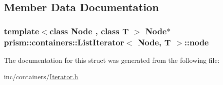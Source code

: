 \subsection{Member Data Documentation}
\subsubsection[{\texorpdfstring{node}{node}}]{\setlength{\rightskip}{0pt plus 5cm}template$<$class Node , class T $>$ Node$\ast$ {\bf prism\+::containers\+::\+List\+Iterator}$<$ Node, T $>$\+::node}\hypertarget{structprism_1_1containers_1_1_list_iterator_ac9b55317f6af025037e1fad2b35c3e11}{}\label{structprism_1_1containers_1_1_list_iterator_ac9b55317f6af025037e1fad2b35c3e11}


The documentation for this struct was generated from the following file\+:\begin{DoxyCompactItemize}
\item 
inc/containers/\hyperlink{_iterator_8h}{Iterator.\+h}\end{DoxyCompactItemize}

